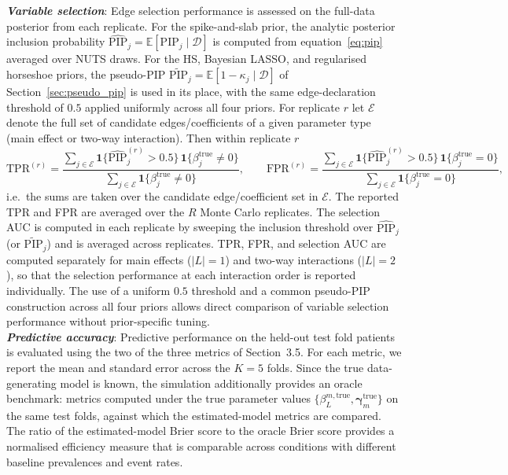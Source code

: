 \documentclass[12pt]{article}
\begin{document}
\noindent\textbf{\textit{Variable selection}}: Edge selection performance is assessed on the full-data posterior from each replicate. For the spike-and-slab prior, the analytic posterior inclusion probability $\widehat{\mathrm{PIP}}_j = \mathbb{E}[\mathrm{PIP}_j \mid \mathcal{D}]$ is computed from equation~\eqref{eq:pip} averaged over NUTS draws. For the HS, Bayesian LASSO, and regularised horseshoe priors, the pseudo-PIP $\widetilde{\mathrm{PIP}}_j = \mathbb{E}[1 - \kappa_j \mid \mathcal{D}]$ of Section~\ref{sec:pseudo_pip} is used in its place, with the same edge-declaration threshold of $0.5$ applied uniformly across all four priors. For replicate $r$ let $\mathcal{E}$ denote the full set of candidate edges/coefficients of a given parameter type (main effect or two-way interaction). Then within replicate $r$
\[
\mathrm{TPR}^{(r)} = \frac{\sum_{j \in \mathcal{E}} \mathbf{1}\{\widehat{\mathrm{PIP}}_j^{(r)} > 0.5\}\, \mathbf{1}\{\beta_j^{\mathrm{true}} \neq 0\}}{\sum_{j \in \mathcal{E}} \mathbf{1}\{\beta_j^{\mathrm{true}} \neq 0\}},
\qquad
\mathrm{FPR}^{(r)} = \frac{\sum_{j \in \mathcal{E}} \mathbf{1}\{\widehat{\mathrm{PIP}}_j^{(r)} > 0.5\}\, \mathbf{1}\{\beta_j^{\mathrm{true}} = 0\}}{\sum_{j \in \mathcal{E}} \mathbf{1}\{\beta_j^{\mathrm{true}} = 0\}},
\]
i.e.\ the sums are taken over the candidate edge/coefficient set in $\mathcal{E}$. The reported TPR and FPR are averaged over the $R$ Monte Carlo replicates. The selection AUC is computed in each replicate by sweeping the inclusion threshold over $\widehat{\mathrm{PIP}}_j$ (or $\widetilde{\mathrm{PIP}}_j$) and is averaged across replicates. TPR, FPR, and selection AUC are computed separately for main effects ($|L|=1$) and two-way interactions ($|L|=2$), so that the selection performance at each interaction order is reported individually. The use of a uniform $0.5$ threshold and a common pseudo-PIP construction across all four priors allows direct comparison of variable selection performance without prior-specific tuning.\\

\noindent \textbf{\textit{Predictive accuracy}}: Predictive performance on the held-out test fold patients is evaluated using the two of the three metrics of Section~3.5. For each metric, we report the mean and standard error across the $K = 5$ folds. Since the true data-generating model is known, the simulation additionally provides an oracle benchmark: metrics computed under the true parameter values $\{\beta^{m,\mathrm{true}}_L, \boldsymbol{\gamma}^{\mathrm{true}}_m\}$ on the same test folds, against which the estimated-model metrics are compared. The ratio of the estimated-model Brier score to the oracle Brier score provides a normalised efficiency measure that is comparable across conditions with different baseline prevalences and event rates.
\end{document}
